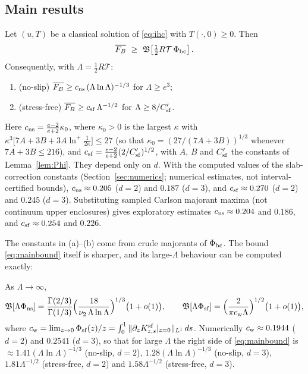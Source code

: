 \subsection{Main results}

\begin{theorem}\label{thm:main}
Let $(u,T)$ be a classical solution of \eqref{eq:ihc} with $T(\cdot,0)\ge0$. Then
\begin{equation}\label{eq:mainbound}
\overline{F_B}\ \ge\ \mathfrak B\!\left[\tfrac12R\mathcal T\,\Phi_{\rm bc}\right].
\end{equation}
Consequently, with $\Lambda=\tfrac12R\mathcal T$:
\begin{enumerate}
\item[(a)] (no-slip) $\overline{F_B}\ge c_{\rm ns}\,(\Lambda\ln\Lambda)^{-1/3}$ for $\Lambda\ge e^3$;
\item[(b)] (stress-free) $\overline{F_B}\ge c_{\rm sf}\,\Lambda^{-1/2}$ for $\Lambda\ge 8/C'_{\rm sf}$.
\end{enumerate}
Here $c_{\rm ns}=\frac{e-2}{e+2}\kappa_0$, where $\kappa_0>0$ is the largest $\kappa$ with
$\kappa^3\big[7A+3B+3A\ln^+\!\frac1{2\kappa}\big]\le27$ (so that $\kappa_0=(27/(7A+3B))^{1/3}$ whenever
$7A+3B\le216$), and $c_{\rm sf}=\frac{e-2}{e+2}(2/C'_{\rm sf})^{1/2}$, with $A$, $B$ and $C'_{\rm sf}$ the
constants of Lemma~\ref{lem:Phi}. They depend only on $d$. With the computed values of the slab-correction
constants (Section~\ref{sec:numerics}; numerical estimates, not interval-certified bounds),
$c_{\rm ns}\approx0.205$ ($d=2$) and $0.187$ ($d=3$), and $c_{\rm sf}\approx0.270$ ($d=2$) and $0.245$ ($d=3$).
Substituting sampled Carlson majorant maxima (not continuum upper enclosures) gives exploratory estimates
$c_{\rm ns}\approx0.204$ and $0.186$, and $c_{\rm sf}\approx0.254$ and $0.226$.
\end{theorem}

The constants in (a)--(b) come from crude majorants of $\Phi_{\rm bc}$. The bound \eqref{eq:mainbound}
itself is sharper, and its large-$\Lambda$ behaviour can be computed exactly:

\begin{proposition}\label{prop:sharp}
As $\Lambda\to\infty$,
\[
\mathfrak B[\Lambda\Phi_{\rm ns}]=\frac{\Gamma(2/3)}{\Gamma(1/3)}\Big(\frac{18}{\nu_2\,\Lambda\ln\Lambda}\Big)^{1/3}\big(1+o(1)\big),
\qquad
\mathfrak B[\Lambda\Phi_{\rm sf}]=\Big(\frac{2}{\pi c_{\rm w}\Lambda}\Big)^{1/2}\big(1+o(1)\big),
\]
where $c_{\rm w}=\lim_{z\to0}\Phi_{\rm sf}(z)/z=\int_0^1\|\partial_zK^{\rm sf}_{z,s}|_{z=0}\|_{L^1}\,ds$.
Numerically $c_{\rm w}\approx0.1944$ ($d=2$) and $0.2541$ ($d=3$), so that for large $\Lambda$ the right side of
\eqref{eq:mainbound} is $\approx1.41(\Lambda\ln\Lambda)^{-1/3}$ (no-slip, $d=2$), $1.28(\Lambda\ln\Lambda)^{-1/3}$
(no-slip, $d=3$), $1.81\Lambda^{-1/2}$ (stress-free, $d=2$) and $1.58\Lambda^{-1/2}$ (stress-free, $d=3$).
\end{proposition}


